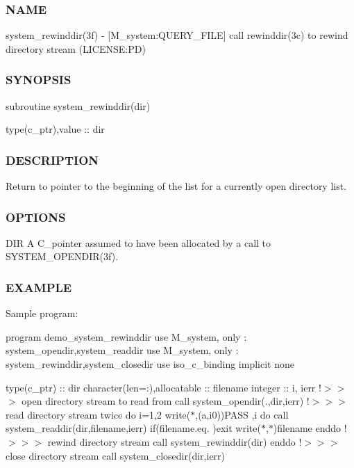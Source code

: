 \subsubsection*{N\+A\+ME}

system\+\_\+rewinddir(3f) -\/ \mbox{[}M\+\_\+system\+:Q\+U\+E\+R\+Y\+\_\+\+F\+I\+LE\mbox{]} call rewinddir(3c) to rewind directory stream (L\+I\+C\+E\+N\+SE\+:PD) \subsubsection*{S\+Y\+N\+O\+P\+S\+IS}

subroutine system\+\_\+rewinddir(dir)

type(c\+\_\+ptr),value \+:\+: dir

\subsubsection*{D\+E\+S\+C\+R\+I\+P\+T\+I\+ON}

Return to pointer to the beginning of the list for a currently open directory list.

\subsubsection*{O\+P\+T\+I\+O\+NS}

D\+IR A C\+\_\+pointer assumed to have been allocated by a call to S\+Y\+S\+T\+E\+M\+\_\+\+O\+P\+E\+N\+D\+I\+R(3f).

\subsubsection*{E\+X\+A\+M\+P\+LE}

Sample program\+:

program demo\+\_\+system\+\_\+rewinddir use M\+\_\+system, only \+: system\+\_\+opendir,system\+\_\+readdir use M\+\_\+system, only \+: system\+\_\+rewinddir,system\+\_\+closedir use iso\+\_\+c\+\_\+binding implicit none

type(c\+\_\+ptr) \+:\+: dir character(len=\+:),allocatable \+:\+: filename integer \+:\+: i, ierr !$>$$>$$>$ open directory stream to read from call system\+\_\+opendir(\textquotesingle{}.\textquotesingle{},dir,ierr) !$>$$>$$>$ read directory stream twice do i=1,2 write($\ast$,\textquotesingle{}(a,i0)\textquotesingle{})\textquotesingle{}P\+A\+SS \textquotesingle{},i do call system\+\_\+readdir(dir,filename,ierr) if(filename.\+eq.\textquotesingle{} \textquotesingle{})exit write($\ast$,$\ast$)filename enddo !$>$$>$$>$ rewind directory stream call system\+\_\+rewinddir(dir) enddo !$>$$>$$>$ close directory stream call system\+\_\+closedir(dir,ierr)

